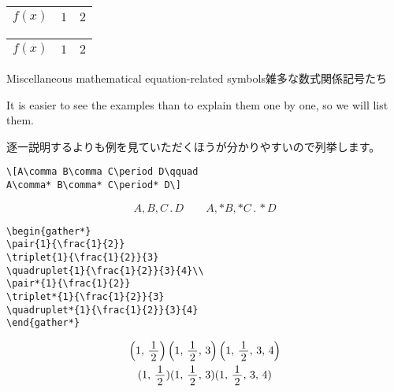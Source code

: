 \documentclass[%
fleqn,%
paper=a4paper,%
fontsize=10pt,%
open_bracket_pos=zenkakunibu_nibu,%
hanging_punctuation,%
]%
{jlreq}
\makeatletter
\DeclareRobustCommand{\linespace}{\@ifstar{\vspace{\baselineskip}}{\vspace{0.25\baselineskip}}}
\DeclareRobustCommand{\linesmash}{\@ifstar{\vspace{-\baselineskip}}{\vspace{-0.25\baselineskip}}}
\newenvironment{translateing}%
{\begin{multicolpar}{2}}
{\end{multicolpar}\vspace{\baselineskip}}
\makeatother
\begin{document}
\begin{macroexample}
\begin{tabular}{ccc}\hline
$f(x)$&$1$&$2$\\\hline
\end{tabular}\quad
\begin{tabular}{ccc}\hline
{}$f(x)$&$1$&$2$\\\hline
\end{tabular}
\end{macroexample}

\hspace*{\fill}\textsf{%
Miscellaneous mathematical equation-related symbols\qquad 雑多な数式関係記号たち%
}\hspace*{\fill}

\linespace
\begin{translateing}
It is easier to see the examples than to explain them one by one, so we will list them.

逐一説明するよりも例を見ていただくほうが分かりやすいので列挙します。
\end{translateing}

\begin{lstlisting}
\[A\comma B\comma C\period D\qquad
A\comma* B\comma* C\period* D\]
\end{lstlisting}

\begin{macroexample}
\linesmash\linesmash
\[A\comma B\comma C\period D\qquad
A\comma* B\comma* C\period* D\]
\end{macroexample}

\begin{lstlisting}
\begin{gather*}
\pair{1}{\frac{1}{2}}
\triplet{1}{\frac{1}{2}}{3}
\quadruplet{1}{\frac{1}{2}}{3}{4}\\
\pair*{1}{\frac{1}{2}}
\triplet*{1}{\frac{1}{2}}{3}
\quadruplet*{1}{\frac{1}{2}}{3}{4}
\end{gather*}
\end{lstlisting}

\begin{macroexample}
\begin{gather*}
\pair{1}{\frac{1}{2}}
\triplet{1}{\frac{1}{2}}{3}
\quadruplet{1}{\frac{1}{2}}{3}{4}\\
\pair*{1}{\frac{1}{2}}
\triplet*{1}{\frac{1}{2}}{3}
\quadruplet*{1}{\frac{1}{2}}{3}{4}
\end{gather*}
\end{macroexample}
\end{document}
